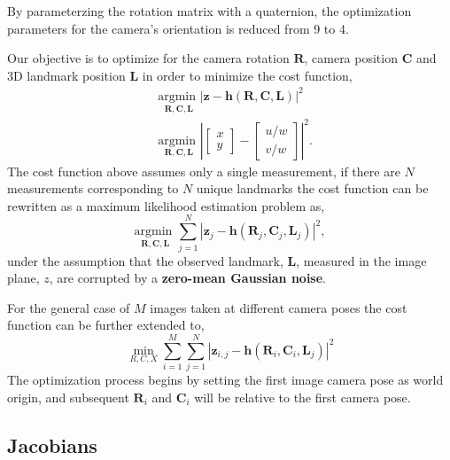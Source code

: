 \documentclass{article}
\renewcommand{\Vec}[1]{{\mathbf{#1}}}
\newcommand{\Argmin}[1]{\underset{#1}{{\text{argmin }}}}
\newcommand{\camRot}{{\Vec{R}}}
\newcommand{\camPos}{{\Vec{C}}}
\newcommand{\landmarkPos}{{\Vec{L}}}
\newcommand{\projFunc}{{\Vec{h}}}
\newcommand{\measurement}{{\Vec{z}}}
\begin{document}
%
By parameterzing the rotation matrix with a quaternion, the optimization
parameters for the camera's orientation is reduced from 9 to 4.

Our objective is to optimize for the camera rotation $\camRot$, camera
position $\camPos$ and 3D landmark position $\landmarkPos$ in order to
minimize the cost function,
%
\begin{align}
  &\Argmin{\camRot, \camPos, \landmarkPos} \left|
    \measurement - \projFunc(\camRot, \camPos, \landmarkPos)
  \right|^{2} \\
  &\Argmin{\camRot, \camPos, \landmarkPos} \left|
    \begin{bmatrix} x \\ y \end{bmatrix} -
    \begin{bmatrix} u / w \\ v / w \end{bmatrix}
  \right|^{2}.
\end{align}
%
The cost function above assumes only a single measurement, if there are $N$
measurements corresponding to $N$ unique landmarks the cost function can be
rewritten as a maximum likelihood estimation problem as,
%
\begin{equation}
  \Argmin{\camRot, \camPos, \landmarkPos}
    \sum_{j = 1}^{N}
      \left|
        \measurement_{j} - \projFunc(\camRot_{j}, \camPos_{j}, \landmarkPos_{j})
      \right|^{2},
\end{equation}
%
under the assumption that the observed landmark, $\landmarkPos$, measured in
the image plane, $z$, are corrupted by a \textbf{zero-mean Gaussian noise}.

For the general case of $M$ images taken at different camera poses the cost
function can be further extended to,
%
\begin{equation}
    \min_{R, C, X} \sum_{i = 1}^{M} \sum_{j = 1}^{N}
        \left|
            \measurement_{i,j} - \projFunc(\camRot_{i}, \camPos_{i}, \landmarkPos_{j})
        \right|^{2}
\end{equation}
%
The optimization process begins by setting the first image camera pose as world
origin, and subsequent $\camRot_{i}$ and $\camPos_{i}$ will be relative to
the first camera pose.


\subsection*{Jacobians}
\end{document}
